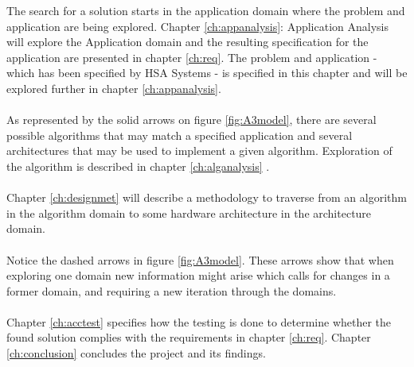 The search for a solution starts in the application domain where the problem and application are being explored. Chapter \vref{ch:appanalysis}: Application Analysis will explore the Application domain and the resulting specification for the application are presented in chapter \vref{ch:req}. The problem and application - which has been specified by HSA Systems - is specified in this chapter and will be explored further in chapter \vref{ch:appanalysis}.\\~\\
As represented by the solid arrows on figure \vref{fig:A3model}, there are several possible algorithms that may match a specified application and several architectures that may be used to implement a given algorithm. Exploration of the algorithm is described in chapter \vref{ch:alganalysis} .\\~\\
Chapter \vref{ch:designmet} will describe a methodology to traverse from an algorithm in the algorithm domain to some hardware architecture in the architecture domain.\\~\\
Notice the dashed arrows in figure \vref{fig:A3model}. These arrows show that when exploring one domain new information might arise which calls for changes in a former domain, and requiring a new iteration through the domains.\\~\\
Chapter \vref{ch:acctest} specifies how the testing is done to determine whether the found solution complies with the requirements in chapter \vref{ch:req}. Chapter \vref{ch:conclusion} concludes the project and its findings. 